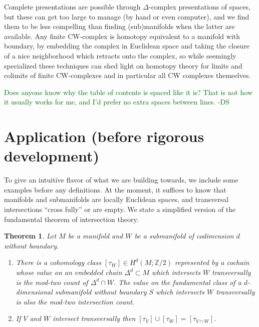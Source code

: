 \documentclass{amsart}          %
\newcommand{\Z}{{\mathbb{Z}}}
\newtheorem{theorem}{Theorem}[section]
\newcommand{\forclass}[1]{\textcolor{darkgreen}{#1 -DS}}
\begin{document}
Complete presentations are possible through $\Delta$-complex
presentations of spaces, but these can get too large to manage (by hand or even computer), and we find them  to be less compelling
than finding (sub)manifolds when the latter are available.  
Any finite CW-complex is homotopy equivalent to a manifold with boundary, by  embedding the complex in Euclidean space
and taking the closure of a nice neighborhood which retracts onto the complex, so while seemingly specialized these techniques
can shed light on homotopy theory for limits and colimits of finite CW-complexes and in particular all CW complexes themselves.

\forclass{Does anyone know why the table of contents is spaced like it is?  That is not how it usually works for me, and I'd prefer no
extra spaces between lines.}

\tableofcontents
\section{Application (before rigorous development)}

To give an intuitive flavor of what we are building towards, we include some examples before any definitions.  At the moment,
it suffices to know that manifolds and submanifolds are locally Euclidean spaces, and transversal intersections ``cross fully'' or are empty.
We  state a simplified version of the fundamental theorem of intersection theory.

\begin{theorem}
Let $M$ be a manifold and $W$ be a submanifold of codimension $d$ without boundary.  
\begin{enumerate}
\item There is a cohomology class $[\tau_{W}] \in H^{d}(M; \Z/2)$ represented by a cochain whose value on an embedded 
chain $\Delta^{d} \subset M$  which intersects $W$ transversally is the mod-two count of $\Delta^{d} \cap W$.  The value
on the fundamental class of a $d$-dimensional 
submanifold without boundary $S$ which intersects $W$ transversally is also the mod-two
intersection count.
\item If $V$ and $W$ intersect transversally then $[\tau_{V}] \cup [\tau_{W}] = [\tau_{V \cap W}]$.
\end{enumerate}
\end{theorem}
\end{document}
